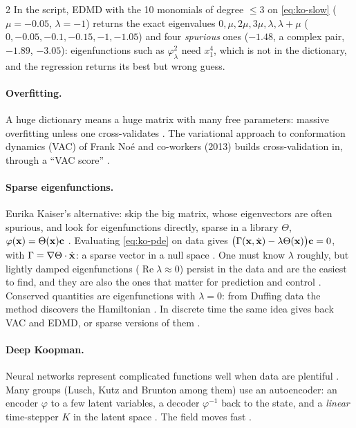 \begin{paracol}{2}
In the script, EDMD with the 10 monomials of degree $\le3$ on \eqref{eq:ko-slow} ($\mu=-0.05$, $\lambda=-1$)
returns the exact eigenvalues $0,\mu,2\mu,3\mu,\lambda,\lambda+\mu$ ($0,-0.05,-0.1,-0.15,-1,-1.05$) and four
\emph{spurious} ones ($-1.48$, a complex pair, $-1.89$, $-3.05$): eigenfunctions such as $\varphi_\lambda^2$ need $x_1^4$,
which is not in the dictionary, and the regression returns its best but wrong guess.

\paragraph{Overfitting.} A huge dictionary means a huge matrix with many free parameters: massive
overfitting unless one cross-validates . The variational approach to conformation
dynamics (VAC) of Frank No\'e and co-workers (2013) builds cross-validation in, through a ``VAC score''
.

\paragraph{Sparse eigenfunctions.} Eurika Kaiser's alternative: skip the big matrix, whose eigenvectors are
often spurious, and look for eigenfunctions directly, sparse in a library $\Theta$, $\varphi(\mathbf{x})=\Theta(\mathbf{x})\mathbf{c}$
. Evaluating \eqref{eq:ko-pde} on data gives
$\big(\Gamma(\mathbf{x},\dot{\mathbf{x}})-\lambda\Theta(\mathbf{x})\big)\mathbf{c}=0$, with $\Gamma=\nabla\Theta\cdot\dot{\mathbf{x}}$: a sparse
vector in a null space . One must know $\lambda$ roughly, but lightly damped
eigenfunctions ($\operatorname{Re}\lambda\approx0$) persist in the data and are the easiest to find, and they are
also the ones that matter for prediction and control . Conserved quantities are
eigenfunctions with $\lambda=0$: from Duffing data the method discovers the Hamiltonian .
In discrete time the same idea gives back VAC and EDMD, or sparse versions of them .

\paragraph{Deep Koopman.} Neural networks represent complicated functions well when data are plentiful
. Many groups (Lusch, Kutz and Brunton among them) use an autoencoder: an encoder $\varphi$ to a few
latent variables, a decoder $\varphi^{-1}$ back to the state, and a \emph{linear} time-stepper $K$ in the
latent space . The field moves fast .


\end{paracol}

